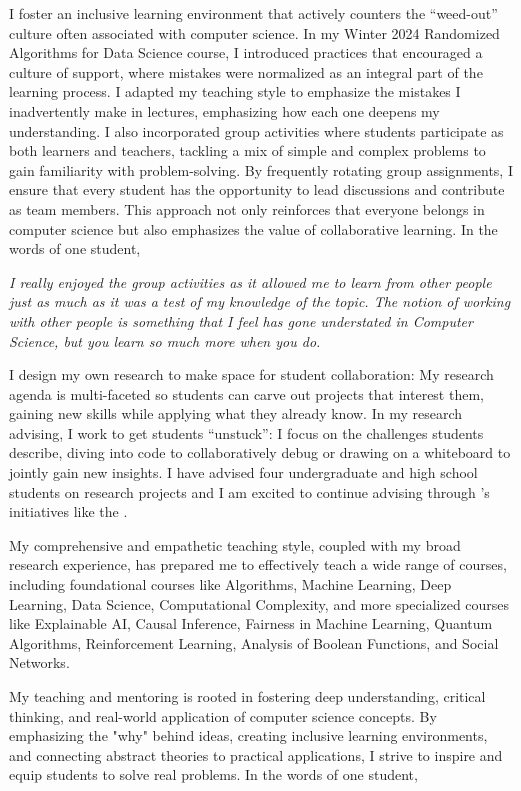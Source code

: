 \documentclass[11pt]{article}
\begin{document}
{I foster an inclusive learning environment that actively counters the “weed-out” culture often associated with computer science. In my Winter 2024 Randomized Algorithms for Data Science course, I introduced practices that encouraged a culture of support, where mistakes were normalized as an integral part of the learning process. I adapted my teaching style to emphasize the mistakes I inadvertently make in lectures, emphasizing how each one deepens my understanding. I also incorporated group activities where students participate as both learners and teachers, tackling a mix of simple and complex problems to gain familiarity with problem-solving. By frequently rotating group assignments, I ensure that every student has the opportunity to lead discussions and contribute as team members. This approach not only reinforces that everyone belongs in computer science but also emphasizes the value of collaborative learning. In the words of one student,

\begin{displayquote}
	\textit{I really enjoyed the group activities as it allowed me to learn from other people just as much as it was a test of my knowledge of the topic. The notion of working with other people is something that I feel has gone understated in Computer Science, but you learn so much more when you do.}
\end{displayquote}

I design my own research to make space for student collaboration: My research agenda is multi-faceted so students can carve out projects that interest them, gaining new skills while applying what they already know. In my research advising, I work to get students “unstuck”: I focus on the challenges students describe, diving into code to collaboratively debug or drawing on a whiteboard to jointly gain new insights. I have advised four undergraduate and high school students on research projects and I am excited to continue advising through \school’s initiatives like the \program.

My comprehensive and empathetic teaching style, coupled with my broad research experience, has prepared me to effectively teach a wide range of courses, including foundational courses like Algorithms, Machine Learning, Deep Learning, Data Science, Computational Complexity, and more specialized courses like Explainable AI, Causal Inference, Fairness in Machine Learning, Quantum Algorithms, Reinforcement Learning, Analysis of Boolean Functions, and Social Networks.

My teaching and mentoring is rooted in fostering deep understanding, critical thinking, and real-world application of computer science concepts. By emphasizing the "why" behind ideas, creating inclusive learning environments, and connecting abstract theories to practical applications, I strive to inspire and equip students to solve real problems. In the words of one student,

}
\end{document}
